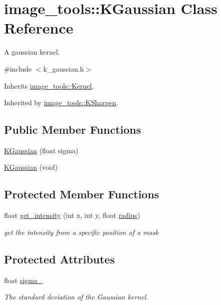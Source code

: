 \hypertarget{classimage__tools_1_1KGaussian}{}\section{image\+\_\+tools\+:\+:K\+Gaussian Class Reference}
\label{classimage__tools_1_1KGaussian}


A gaussian kernel.  




{\ttfamily \#include $<$k\+\_\+gaussian.\+h$>$}



Inherits \hyperlink{classimage__tools_1_1Kernel}{image\+\_\+tools\+::\+Kernel}.



Inherited by \hyperlink{classimage__tools_1_1KSharpen}{image\+\_\+tools\+::\+K\+Sharpen}.

\subsection*{Public Member Functions}
\begin{DoxyCompactItemize}
\item 
\hyperlink{classimage__tools_1_1KGaussian_af915a99f8a1e7bcc6331240844ce3842}{K\+Gaussian} (float sigma)
\item 
\hyperlink{classimage__tools_1_1KGaussian_a9543ed1be44f4f70668f4569c09b12a1}{K\+Gaussian} (void)
\end{DoxyCompactItemize}
\subsection*{Protected Member Functions}
\begin{DoxyCompactItemize}
\item 
float \hyperlink{classimage__tools_1_1KGaussian_abf2ee77d07b4a34f52e15826edb969ce}{get\+\_\+intensity} (int x, int y, float \hyperlink{classimage__tools_1_1Kernel_ac834d16a242dd4a15f5f5e4a6dacea01}{radius})
\begin{DoxyCompactList}\small\item\em get the intensity from a specific position of a mask \end{DoxyCompactList}\end{DoxyCompactItemize}
\subsection*{Protected Attributes}
\begin{DoxyCompactItemize}
\item 
float \hyperlink{classimage__tools_1_1KGaussian_aae4a308fd2f1065b363660681c863eed}{sigma\+\_\+}
\begin{DoxyCompactList}\small\item\em The standard deviation of the Gaussian kernel. \end{DoxyCompactList}\end{DoxyCompactItemize}


